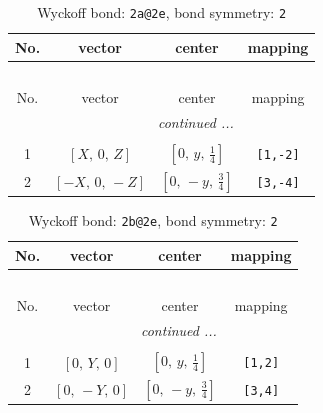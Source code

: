 \documentclass[fleqn,8pt]{jsarticle}
\begin{document}
\begin{longtable}{cccc}
\caption{Wyckoff bond: {\tt 2a@2e}, bond symmetry: {\tt 2}}
 \\
 \hline \hline
No. & vector & center & mapping \\ \hline \endfirsthead

\multicolumn{3}{l}{\tablename\ \thetable{}} \\
 \hline \hline
No. & vector & center & mapping \\ \hline \endhead

 \hline \hline
\multicolumn{3}{r}{\footnotesize\it continued ...} \\ \endfoot

 \hline \hline
\multicolumn{3}{r}{} \\ \endlastfoot

1 & $\left[ X,\, 0,\, Z \right]$ & $\left[ 0,\, y,\, \frac{1}{4} \right]$ & {\tt [1,-2]} \\ \hline
2 & $\left[ - X,\, 0,\, - Z \right]$ & $\left[ 0,\, - y,\, \frac{3}{4} \right]$ & {\tt [3,-4]} \\
\end{longtable}
\renewcommand{\arraystretch}{1.2}
\begin{longtable}{cccc}
\caption{Wyckoff bond: {\tt 2b@2e}, bond symmetry: {\tt 2}}
 \\
 \hline \hline
No. & vector & center & mapping \\ \hline \endfirsthead

\multicolumn{3}{l}{\tablename\ \thetable{}} \\
 \hline \hline
No. & vector & center & mapping \\ \hline \endhead

 \hline \hline
\multicolumn{3}{r}{\footnotesize\it continued ...} \\ \endfoot

 \hline \hline
\multicolumn{3}{r}{} \\ \endlastfoot

1 & $\left[ 0,\, Y,\, 0 \right]$ & $\left[ 0,\, y,\, \frac{1}{4} \right]$ & {\tt [1,2]} \\ \hline
2 & $\left[ 0,\, - Y,\, 0 \right]$ & $\left[ 0,\, - y,\, \frac{3}{4} \right]$ & {\tt [3,4]} \\
\end{longtable}
\renewcommand{\arraystretch}{1.2}
\end{document}

